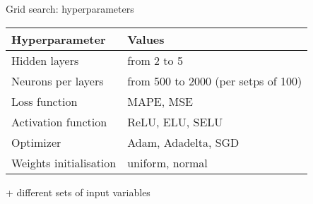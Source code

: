 \begin{frame}{Grid search: hyperparameters}

\begin{center}
\begin{tabular}{ll}
\toprule
Hyperparameter & Values\\
\midrule
Hidden layers & from 2 to 5\\
Neurons per layers & from 500 to 2000 (per setps of 100)\\
Loss function & MAPE, MSE\\
Activation function & ReLU, ELU, SELU\\
Optimizer & Adam, Adadelta, SGD\\
Weights initialisation & uniform, normal
\bottomrule
\end{tabular}
\end{center}

+ different sets of input variables

\end{frame}